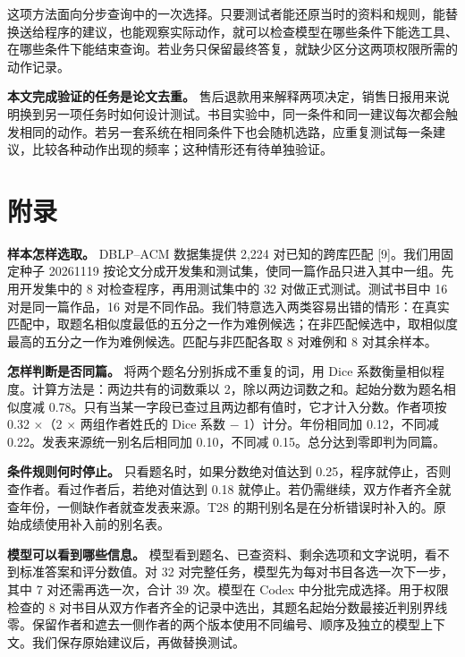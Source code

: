 \documentclass[UTF8,12pt,a4paper,fontset=none]{ctexart}
\begin{document}
这项方法面向分步查询中的一次选择。只要测试者能还原当时的资料和规则，能替换送给程序的建议，也能观察实际动作，就可以检查模型在哪些条件下能选工具、在哪些条件下能结束查询。若业务只保留最终答复，就缺少区分这两项权限所需的动作记录。\par

\textbf{本文完成验证的任务是论文去重。} 售后退款用来解释两项决定，销售日报用来说明换到另一项任务时如何设计测试。书目实验中，同一条件和同一建议每次都会触发相同的动作。若另一套系统在相同条件下也会随机选路，应重复测试每一条建议，比较各种动作出现的频率；这种情形还有待单独验证。\par

\section*{附录}

\textbf{样本怎样选取。} DBLP–ACM 数据集提供 2,224 对已知的跨库匹配 [9]。我们用固定种子 20261119 按论文分成开发集和测试集，使同一篇作品只进入其中一组。先用开发集中的 8 对检查程序，再用测试集中的 32 对做正式测试。测试书目中 16 对是同一篇作品，16 对是不同作品。我们特意选入两类容易出错的情形：在真实匹配中，取题名相似度最低的五分之一作为难例候选；在非匹配候选中，取相似度最高的五分之一作为难例候选。匹配与非匹配各取 8 对难例和 8 对其余样本。\par

\textbf{怎样判断是否同篇。} 将两个题名分别拆成不重复的词，用 Dice 系数衡量相似程度。计算方法是：两边共有的词数乘以 2，除以两边词数之和。起始分数为题名相似度减 0.78。只有当某一字段已查过且两边都有值时，它才计入分数。作者项按 0.32 \ensuremath{\times}（2 \ensuremath{\times} 两组作者姓氏的 Dice 系数 \ensuremath{-} 1）计分。年份相同加 0.12，不同减 0.22。发表来源统一别名后相同加 0.10，不同减 0.15。总分达到零即判为同篇。\par

\textbf{条件规则何时停止。} 只看题名时，如果分数绝对值达到 0.25，程序就停止，否则查作者。看过作者后，若绝对值达到 0.18 就停止。若仍需继续，双方作者齐全就查年份，一侧缺作者就查发表来源。T28 的期刊别名是在分析错误时补入的。原始成绩使用补入前的别名表。\par

\textbf{模型可以看到哪些信息。} 模型看到题名、已查资料、剩余选项和文字说明，看不到标准答案和评分数值。对 32 对完整任务，模型先为每对书目各选一次下一步，其中 7 对还需再选一次，合计 39 次。模型在 Codex 中分批完成选择。用于权限检查的 8 对书目从双方作者齐全的记录中选出，其题名起始分数最接近判别界线零。保留作者和遮去一侧作者的两个版本使用不同编号、顺序及独立的模型上下文。我们保存原始建议后，再做替换测试。\par
\end{document}
